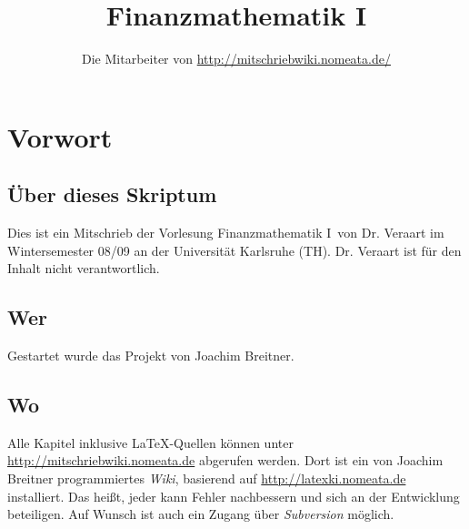 \documentclass[a4paper,twoside,DIV15,BCOR12mm]{scrbook}
\author{Die Mitarbeiter von \url{http://mitschriebwiki.nomeata.de/}}
\title{Finanzmathematik I}
\begin{document}
\maketitle
 
\newenvironment{enuma}{%
\begin{enumerate}[\hspace{1em}a)]%
}{%
\end{enumerate}%
}

\newenvironment{enumi}{%
\begin{enumerate}[\hspace{1em}i)]%
}{%
\end{enumerate}%
}

\setcounter{secnumdepth}{-1}
\tableofcontents


\chapter{Vorwort}
\setcounter{secnumdepth}{2}

\section*{Über dieses Skriptum}
Dies ist ein Mitschrieb der Vorlesung \glqq Finanzmathematik I\grqq\ von Dr. Veraart im
Wintersemester 08/09 an der Universität Karlsruhe (TH).
Dr. Veraart ist für  den Inhalt nicht verantwortlich.
\section*{Wer}
Gestartet wurde das Projekt von Joachim Breitner.

\section*{Wo}
Alle Kapitel inklusive \LaTeX-Quellen können unter \url{http://mitschriebwiki.nomeata.de} abgerufen werden.
Dort ist ein von Joachim Breitner programmiertes \emph{Wiki}, basierend auf \url{http://latexki.nomeata.de} installiert. 
Das heißt, jeder kann Fehler nachbessern und sich an der Entwicklung
beteiligen. Auf Wunsch ist auch ein Zugang über \emph{Subversion} möglich.
\end{document}
